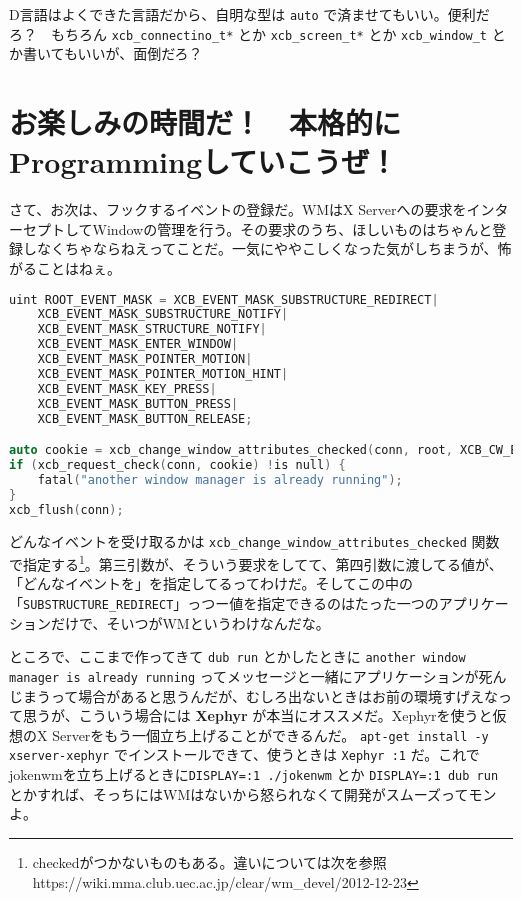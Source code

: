 \documentclass[12pt,a4paper]{jsarticle}
\begin{document}
D言語はよくできた言語だから、自明な型は \lstinline{auto} で済ませてもいい。便利だろ？　もちろん \lstinline{xcb_connectino_t*} とか \lstinline{xcb_screen_t*} とか \lstinline{xcb_window_t} とか書いてもいいが、面倒だろ？

\section{お楽しみの時間だ！　本格的にProgrammingしていこうぜ！}

さて、お次は、フックするイベントの登録だ。WMはX Serverへの要求をインターセプトしてWindowの管理を行う。その要求のうち、ほしいものはちゃんと登録しなくちゃならねえってことだ。一気にややこしくなった気がしちまうが、怖がることはねぇ。

\begin{lstlisting}[language=C++]
uint ROOT_EVENT_MASK = XCB_EVENT_MASK_SUBSTRUCTURE_REDIRECT|
	XCB_EVENT_MASK_SUBSTRUCTURE_NOTIFY|
	XCB_EVENT_MASK_STRUCTURE_NOTIFY|
	XCB_EVENT_MASK_ENTER_WINDOW|
	XCB_EVENT_MASK_POINTER_MOTION|
	XCB_EVENT_MASK_POINTER_MOTION_HINT|
	XCB_EVENT_MASK_KEY_PRESS|
	XCB_EVENT_MASK_BUTTON_PRESS|
	XCB_EVENT_MASK_BUTTON_RELEASE;

auto cookie = xcb_change_window_attributes_checked(conn, root, XCB_CW_EVENT_MASK, &ROOT_EVENT_MASK);
if (xcb_request_check(conn, cookie) !is null) {
	fatal("another window manager is already running");		
}
xcb_flush(conn);
\end{lstlisting}

どんなイベントを受け取るかは \lstinline{xcb_change_window_attributes_checked} 関数で指定する\footnote{checkedがつかないものもある。違いについては次を参照 \\ https://wiki.mma.club.uec.ac.jp/clear/wm\_devel/2012-12-23}。第三引数が、そういう要求をしてて、第四引数に渡してる値が、「どんなイベントを」を指定してるってわけだ。そしてこの中の「\lstinline{SUBSTRUCTURE_REDIRECT}」っつー値を指定できるのはたった一つのアプリケーションだけで、そいつがWMというわけなんだな。

ところで、ここまで作ってきて \lstinline{dub run} とかしたときに \lstinline{another window manager is already running} ってメッセージと一緒にアプリケーションが死んじまうって場合があると思うんだが、むしろ出ないときはお前の環境すげえなって思うが、こういう場合には \textbf{Xephyr} が本当にオススメだ。Xephyrを使うと仮想のX Serverをもう一個立ち上げることができるんだ。 \lstinline{apt-get install -y xserver-xephyr} でインストールできて、使うときは \lstinline{Xephyr :1} だ。これでjokenwmを立ち上げるときに\lstinline{DISPLAY=:1 ./jokenwm} とか \lstinline{DISPLAY=:1 dub run} とかすれば、そっちにはWMはないから怒られなくて開発がスムーズってモンよ。
\end{document}
